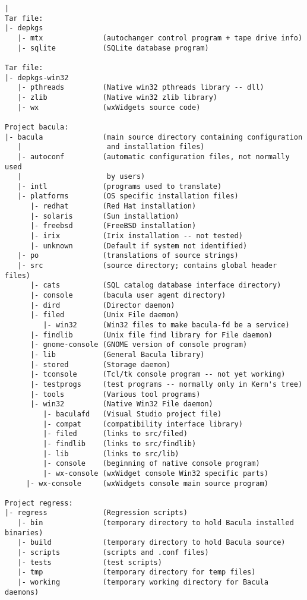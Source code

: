 \footnotesize
\begin{verbatim}
|
Tar file:
|- depkgs
   |- mtx              (autochanger control program + tape drive info)
   |- sqlite           (SQLite database program)

Tar file:
|- depkgs-win32
   |- pthreads         (Native win32 pthreads library -- dll)
   |- zlib             (Native win32 zlib library)
   |- wx               (wxWidgets source code)

Project bacula:
|- bacula              (main source directory containing configuration
   |                    and installation files)
   |- autoconf         (automatic configuration files, not normally used
   |                    by users)
   |- intl             (programs used to translate)
   |- platforms        (OS specific installation files)
      |- redhat        (Red Hat installation)
      |- solaris       (Sun installation)
      |- freebsd       (FreeBSD installation)
      |- irix          (Irix installation -- not tested)
      |- unknown       (Default if system not identified)
   |- po               (translations of source strings)
   |- src              (source directory; contains global header files)
      |- cats          (SQL catalog database interface directory)
      |- console       (bacula user agent directory)
      |- dird          (Director daemon)
      |- filed         (Unix File daemon)
         |- win32      (Win32 files to make bacula-fd be a service)
      |- findlib       (Unix file find library for File daemon)
      |- gnome-console (GNOME version of console program)
      |- lib           (General Bacula library)
      |- stored        (Storage daemon)
      |- tconsole      (Tcl/tk console program -- not yet working)
      |- testprogs     (test programs -- normally only in Kern's tree)
      |- tools         (Various tool programs)
      |- win32         (Native Win32 File daemon)
         |- baculafd   (Visual Studio project file)
         |- compat     (compatibility interface library)
         |- filed      (links to src/filed)
         |- findlib    (links to src/findlib)
         |- lib        (links to src/lib)
         |- console    (beginning of native console program)
         |- wx-console (wxWidget console Win32 specific parts)
     |- wx-console     (wxWidgets console main source program)

Project regress:
|- regress             (Regression scripts)
   |- bin              (temporary directory to hold Bacula installed binaries)
   |- build            (temporary directory to hold Bacula source)
   |- scripts          (scripts and .conf files)
   |- tests            (test scripts)
   |- tmp              (temporary directory for temp files)
   |- working          (temporary working directory for Bacula daemons)


\end{verbatim}
